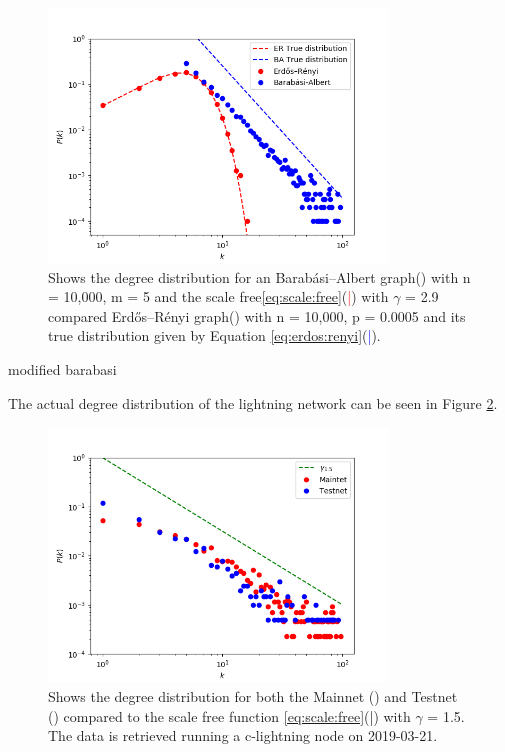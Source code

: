 \begin{figure}[!htb]
	\hspace*{-0.5cm} 
	\centering
	\includegraphics[width=9cm]{images/scale_free_degree_distribution.png}
	\caption{Shows the degree distribution for an Barabási–Albert graph(\tikzcircle[red, fill=red]{2pt}) with n = 10,000, m = 5 and the scale free\ref{eq:scale:free}(\textcolor{red}{|}) with $\gamma$ = 2.9 compared Erdős–Rényi graph(\tikzcircle[blue, fill=blue]{2pt}) with n = 10,000, p = 0.0005 and its true distribution given by Equation \ref{eq:erdos:renyi}(\textcolor{blue}{|}).
	}
	\label{fig:scale_free}
	\hspace*{2mm} 
\end{figure}

modified barabasi

The actual degree distribution of the lightning network can be seen in Figure \ref{fig:real_network}.

\begin{figure}[!htb]
	\hspace*{-0.5cm} 
	\centering
	\includegraphics[width=9cm]{images/main-testnet_degree_distribution.png}
	\caption{Shows the degree distribution for both the Mainnet (\tikzcircle[red, fill=red]{2pt}) and Testnet (\tikzcircle[blue, fill=blue]{2pt})
		compared to the scale free function \ref{eq:scale:free}(\textcolor{black}{|}) with $\gamma$ = 1.5. The data is retrieved running a c-lightning node\cite{repository:clightning} on 2019-03-21.
	}
	\label{fig:real_network}
	\hspace*{2mm} 
\end{figure}

